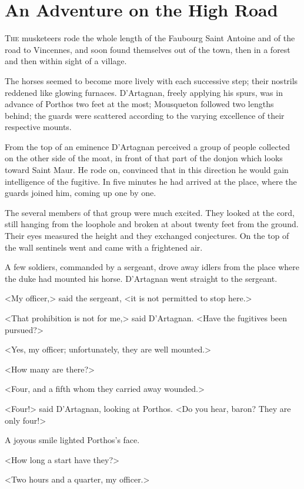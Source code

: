 \chapter{An Adventure on the High Road}

 \lettrine{T}{he} musketeers rode the whole length of the Faubourg Saint Antoine and of the road to Vincennes, and soon found themselves out of the town, then in a forest and then within sight of a village.

The horses seemed to become more lively with each successive step; their nostrils reddened like glowing furnaces. D'Artagnan, freely applying his spurs, was in advance of Porthos two feet at the most; Mousqueton followed two lengths behind; the guards were scattered according to the varying excellence of their respective mounts.

From the top of an eminence D'Artagnan perceived a group of people collected on the other side of the moat, in front of that part of the donjon which looks toward Saint Maur. He rode on, convinced that in this direction he would gain intelligence of the fugitive. In five minutes he had arrived at the place, where the guards joined him, coming up one by one.

The several members of that group were much excited. They looked at the cord, still hanging from the loophole and broken at about twenty feet from the ground. Their eyes measured the height and they exchanged conjectures. On the top of the wall sentinels went and came with a frightened air.

A few soldiers, commanded by a sergeant, drove away idlers from the place where the duke had mounted his horse. D'Artagnan went straight to the sergeant.

<My officer,> said the sergeant, <it is not permitted to stop here.>

<That prohibition is not for me,> said D'Artagnan. <Have the fugitives been pursued?>

<Yes, my officer; unfortunately, they are well mounted.>

<How many are there?>

<Four, and a fifth whom they carried away wounded.>

<Four!> said D'Artagnan, looking at Porthos. <Do you hear, baron? They are only four!>

A joyous smile lighted Porthos's face.

<How long a start have they?>

<Two hours and a quarter, my officer.>

